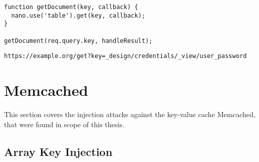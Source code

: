 \begin{lstlisting}[caption={Vulnerable NodeJS example for URL traversal injection on CouchDB}, label={lst:PHPArrayInjection}]
function getDocument(key, callback) {
  nano.use('table').get(key, callback);
}

getDocument(req.query.key, handleResult);
\end{lstlisting}

\begin{lstlisting}[caption={Attack vectors on CouchDB for URL traversal injection via HTTP GET}, label={lst:PHPArrayInjection}]
https://example.org/get?key=_design/credentials/_view/user_password
\end{lstlisting}

\section{Memcached}
This section covers the injection attacks against the key-value cache Memcached, that were found in scope of this thesis.
\subsection{Array Key Injection}